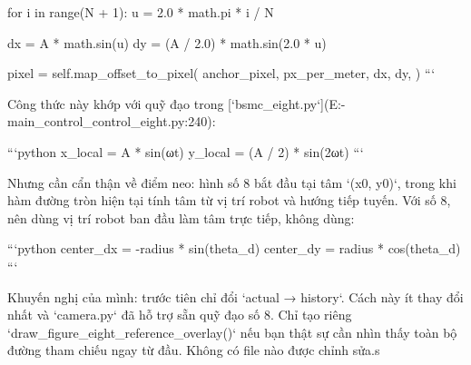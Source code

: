     for i in range(N + 1):
        u = 2.0 * math.pi * i / N

        dx = A * math.sin(u)
        dy = (A / 2.0) * math.sin(2.0 * u)

        pixel = self.map_offset_to_pixel(
            anchor_pixel,
            px_per_meter,
            dx,
            dy,
        )
```

Công thức này khớp với quỹ đạo trong [`bsmc_eight.py`](E:\NCKH{}-main\src\amr_control\amr_control\bsmc_eight.py:240):

```python
x_local = A * sin(ωt)
y_local = (A / 2) * sin(2ωt)
```

Nhưng cần cẩn thận về điểm neo: hình số 8 bắt đầu tại tâm `(x0, y0)`, trong khi hàm đường tròn hiện tại tính tâm từ vị trí robot và hướng tiếp tuyến. Với số 8, nên dùng vị trí robot ban đầu làm tâm trực tiếp, không dùng:

```python
center_dx = -radius * sin(theta_d)
center_dy = radius * cos(theta_d)
```

Khuyến nghị của mình: trước tiên chỉ đổi `actual → history`. Cách này ít thay đổi nhất và `camera.py` đã hỗ trợ sẵn quỹ đạo số 8. Chỉ tạo riêng `draw_figure_eight_reference_overlay()` nếu bạn thật sự cần nhìn thấy toàn bộ đường tham chiếu ngay từ đầu. Không có file nào được chỉnh sửa.s

